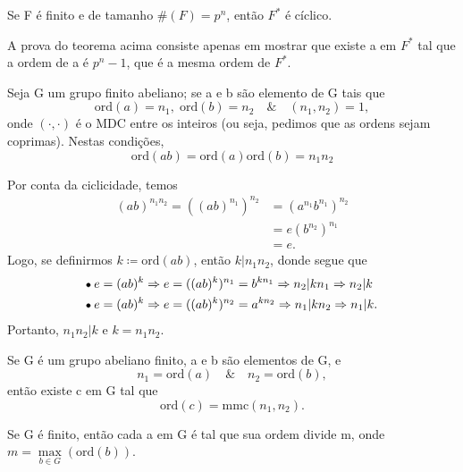 \documentclass[../algebraIII_notes.tex]{subfiles}
\begin{document}
\begin{theorem*}
	Se F é finito e de tamanho \(\#(F)=p^{n}\), então \(F^{*}\) é cíclico.
\end{theorem*}
A prova do teorema acima consiste apenas em mostrar que existe a em \(F^{*}\) tal que a ordem de a é \(p^{n}-1\), que é a mesma ordem de \(F^{*}\).
\begin{lemma*}
	Seja G um grupo finito abeliano; se a e b são elemento de G tais que
	\[
		\mathrm{ord}(a)=n_{1},\; \mathrm{ord}(b)=n_2 \quad\&\quad (n_1, n_2)=1,
	\]
	onde \((\cdot , \cdot )\) é o MDC entre os inteiros (ou seja, pedimos que as ordens sejam coprimas). Nestas condições,
	\[
		\mathrm{ord}(ab)=\mathrm{ord}(a)\mathrm{ord}(b)=n_1 n_2
	\]
\end{lemma*}
\begin{proof*}
	Por conta da ciclicidade, temos
	\begin{align*}
		(ab)^{n_1 n_2} = ((ab)^{n_1})^{n_2} & = (a^{n_1}b^{n_1})^{n_2} \\
		                                    & = e (b^{n_2})^{n_1}      \\
		                                    & = e.
	\end{align*}
	Logo, se definirmos \(k\coloneqq \mathrm{ord}(ab)\), então \(k | n_1 n_2\), donde segue que
	\begin{align*}
		 & \tikz[baseline=-0.5ex]\draw[black, fill=black, radius=1.5pt](0, 0)circle;\; e=(ab)^{k} \Rightarrow e=((ab)^{k})^{n_1}=b^{kn_1}\Rightarrow n_2|kn_1 \Rightarrow n_2|k  \\
		 & \tikz[baseline=-0.5ex]\draw[black, fill=black, radius=1.5pt](0, 0)circle;\; e=(ab)^{k} \Rightarrow e=((ab)^{k})^{n_2}=a^{kn_2}\Rightarrow n_1|kn_2 \Rightarrow n_1|k.
	\end{align*}
	Portanto, \(n_1 n_2 | k\) e \(k = n_1 n_2\). \qedsymbol
\end{proof*}
\begin{crl*}
	Se G é um grupo abeliano finito, a e b são elementos de G, e
	\[
		n_1 = \mathrm{ord}(a) \quad\&\quad n_2=\mathrm{ord}(b),
	\]
	então existe c em G tal que
	\[
		\mathrm{ord}(c)= \mathrm{mmc}(n_1, n_2).
	\]
\end{crl*}
\begin{theorem*}
	Se G é finito, então cada a em G é tal que sua ordem divide m, onde \(m=\max\limits_{b\in G}(\mathrm{ord}(b))\).
\end{theorem*}
\end{document}

